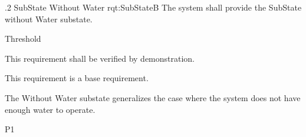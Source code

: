 \ONERQMTV
{\RqtNumberBase.2}
{SubState Without Water}
{rqt:SubStateB}
{The system shall provide the SubState without Water substate.}
{
	\item [Phase 1] Threshold
}
{This requirement shall be verified by demonstration.}
{
	\item [N/A] This requirement is a base requirement.
}
{
	\item The Without Water substate generalizes the case where the system does not have enough water to operate.
}
{P1}

